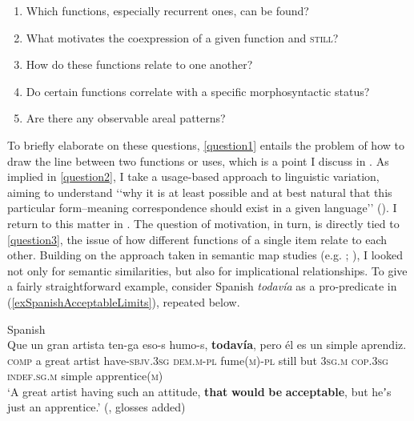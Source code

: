 \begin{enumerate}[label=(\roman*)]
	\item Which functions, especially recurrent ones, can be found?\label{question1}
	\item What motivates the coexpression of a given function and \textsc{still}?\label{question2}
	\item How do these functions relate to one another?\label{question3}
	\item Do certain functions correlate with a specific morphosyntactic status?	\label{question4}
	\item Are there any observable areal patterns?\label{question5}
\end{enumerate}

To briefly elaborate on these questions, \ref{question1} entails the problem of how to draw the line between two functions or uses, which is a point I discuss in . As implied in \ref{question2}, I take a usage-based approach to linguistic variation, aiming to understand \lq\lq why it is at least possible and at best natural that this particular form–meaning correspondence should exist in a given language\rq\rq{ }(\cite[217]{Goldberg2006}). I return to this matter in . The question of motivation, in turn, is directly tied to \ref{question3}, the issue of how different functions of a single item relate to each other. Building on the approach taken in semantic map studies (e.g. \cite{GeorgakopulosPolis2008}; \cite{Haspelmath2003}), I looked not only for semantic similarities, but also for implicational relationships. To give a fairly straightforward example, consider Spanish \textit{todavía} as a pro-predicate in (\ref{exSpanishAcceptableLimits}), repeated below.

\begin{exe}
	Spanish\\
	\gll Que un gran artista ten-ga eso-s humo-s, \textbf{todavía}, pero él es un simple aprendiz.\\
	\textsc{comp} a great artist have-\textsc{sbjv}.3\textsc{sg} \textsc{dem}.\textsc{m}-\textsc{pl} fume(\textsc{m})-\textsc{pl} still but \textsc{3sg.m} \textsc{cop}.3\textsc{sg} \textsc{indef}.\textsc{sg}.\textsc{m} simple apprentice(\textsc{m})\\
	\glt \lq A great artist having such an attitude, \textbf{that} \textbf{would} \textbf{be} \textbf{acceptable}, but heʼs just an apprentice.\rq{ }(\cite[207]{Bosque2016}, glosses added)
\end{exe}

